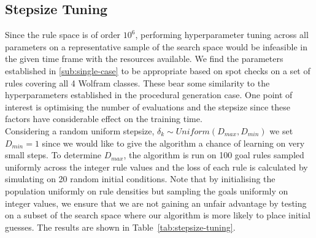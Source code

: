\subsection{Stepsize Tuning}\label{sub:stepsize-tuning}
 
Since the rule space is of order $10^6$, performing hyperparameter tuning across all parameters on a representative sample of the search space would be infeasible in the given time frame with the resources available. We find the parameters established in \ref{sub:single-case} to be appropriate based on spot checks on a set of rules covering all 4 Wolfram classes. These bear some similarity to the hyperparameters established in the procedural generation case. One point of interest is optimising the number of evaluations and the stepsize since these factors have considerable effect on the training time.\\

Considering a random uniform stepsize, $\delta_k \sim \mathit{Uniform}(D_{max}, D_{min})$ we set $D_{min} = 1$ since we would like to give the algorithm a chance of learning on very small steps. To determine $D_{max}$, the algorithm is run on 100 goal rules sampled uniformly across the integer rule values and the loss of each rule is calculated by simulating on 20 random initial conditions. Note that by initialising the population uniformly on rule densities but sampling the goals uniformly on integer values, we ensure that we are not gaining an unfair advantage by testing on a subset of the search space where our algorithm is more likely to place initial guesses. The results are shown in Table~\ref{tab:stepsize-tuning}.\\

\begin{table} 
    \centering\hfill
    \hfill
    \hfill
\label{tab:stepsize-tuning}
\end{table}

